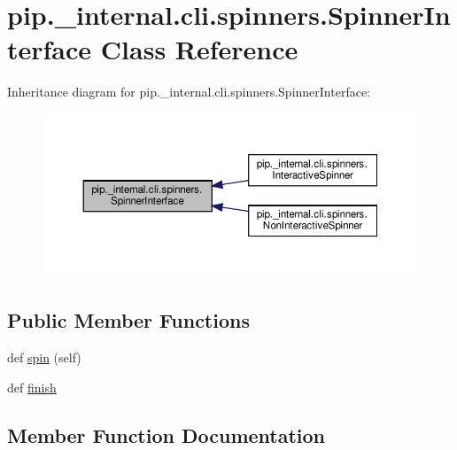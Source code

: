 \hypertarget{classpip_1_1__internal_1_1cli_1_1spinners_1_1SpinnerInterface}{}\section{pip.\+\_\+internal.\+cli.\+spinners.\+Spinner\+Interface Class Reference}
\label{classpip_1_1__internal_1_1cli_1_1spinners_1_1SpinnerInterface}


Inheritance diagram for pip.\+\_\+internal.\+cli.\+spinners.\+Spinner\+Interface\+:
\nopagebreak
\begin{figure}[H]
\begin{center}
\leavevmode
\includegraphics[width=350pt]{classpip_1_1__internal_1_1cli_1_1spinners_1_1SpinnerInterface__inherit__graph}
\end{center}
\end{figure}
\subsection*{Public Member Functions}
\begin{DoxyCompactItemize}
\item 
def \hyperlink{classpip_1_1__internal_1_1cli_1_1spinners_1_1SpinnerInterface_ab9ee9b6a6fbfbb7306e9e24d2f247703}{spin} (self)
\item 
def \hyperlink{classpip_1_1__internal_1_1cli_1_1spinners_1_1SpinnerInterface_a13a5d5d6f53a82d7543877c341360abe}{finish}
\end{DoxyCompactItemize}


\subsection{Member Function Documentation}
\mbox{\label{classpip_1_1__internal_1_1cli_1_1spinners_1_1SpinnerInterface_a13a5d5d6f53a82d7543877c341360abe}} 
